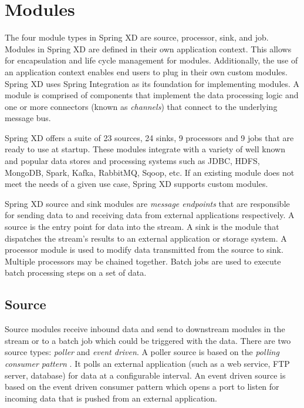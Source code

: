 \section{Modules}
\label{sec:Modules}
The four module types in Spring XD are source, processor, sink, and job. Modules
in Spring XD are defined in their own application context. This allows for encapsulation
and life cycle management for modules. Additionally, the use of an application context
enables end users to plug in their own custom modules. Spring XD uses Spring 
Integration as its foundation for implementing modules. A module is comprised of components that
implement the data processing logic and one or more connectors (known as \emph{channels})
that connect to the underlying message bus.

\par

Spring XD offers a suite of 23 sources, 24 sinks, 9 processors and 9 jobs that are ready
to use at startup.  These modules integrate with a variety of well known and popular
data stores and processing systems such as JDBC\cite{jdbc}, HDFS, MongoDB\cite{mongodb},
Spark, Kafka, RabbitMQ, Sqoop, etc.  If an existing module does not meet the needs of a
given use case, Spring XD supports custom modules.

Spring XD source and sink modules are \emph{message endpoints}
\cite{enterprise-integration-pattern-message-endpoint}
that are responsible for sending data to and receiving data from external applications
respectively. A source is the entry point for data into the stream. A sink is
the module that dispatches the stream's results to an external application or storage system.
A processor module is used to modify data transmitted from the source to sink.
Multiple processors may be chained together. Batch jobs are used to execute batch
processing steps on a set of data.

\par

\subsection{Source}
\label{sec:Source}
Source modules receive inbound data and send to downstream modules in the stream or to a batch job
which could be triggered with the data. There are two source types: \emph{poller} and \emph{event driven}.
A poller source is based on the \emph{polling consumer pattern}
\cite{enterprise-integration-pattern-pollingconsumer}.
It polls an external application (such as a web service, FTP server, database) for data at a
configurable interval. An event driven source is based on the event driven
consumer pattern \cite{enterprise-integration-pattern-eventdrivenconsumer} which
opens a port to listen for incoming data that is pushed from an external application.

